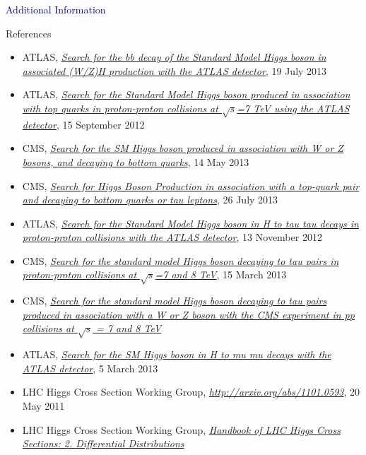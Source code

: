 \documentclass{beamer}
\begin{document}
\begin{frame}
	\textcolor{Navy}{Additional Information}
\end{frame}


\begin{frame}{References}
	\begin{itemize} \scriptsize
		\item ATLAS, \href{https://atlas.web.cern.ch/Atlas/GROUPS/PHYSICS/CONFNOTES/ATLAS-CONF-2013-079/}{ \textit{Search for the bb decay of the Standard Model Higgs boson in associated (W/Z)H production with the ATLAS detector}}, 19 July 2013
		\item ATLAS, \href{https://atlas.web.cern.ch/Atlas/GROUPS/PHYSICS/CONFNOTES/ATLAS-CONF-2012-135/}{\textit{Search for the Standard Model Higgs boson produced in association with top quarks in proton-proton collisions at $\sqrt s$=7 TeV using the ATLAS detector}}, 15 September 2012
		\item CMS, \href{http://cds.cern.ch/record/1546801?ln=en}{\textit{Search for the SM Higgs boson produced in association with W or Z bosons, and decaying to bottom quarks}}, 14 May 2013
		\item CMS, \href{http://cds.cern.ch/record/1564682?ln=en}{\textit{Search for Higgs Boson Production in association with a top-quark pair and decaying to bottom quarks or tau leptons}}, 26 July 2013
		\item ATLAS, \href{https://atlas.web.cern.ch/Atlas/GROUPS/PHYSICS/CONFNOTES/ATLAS-CONF-2012-160/}{\textit{Search for the Standard Model Higgs boson in H to tau tau decays in proton-proton collisions with the ATLAS detector}}, 13 November 2012
		\item CMS, \href{https://cds.cern.ch/record/1528271?ln=en}{\textit{Search for the standard model Higgs boson decaying to tau pairs in proton-proton collisions at $\sqrt s$=7 and 8 TeV}}, 15 March 2013
		\item CMS, \href{https://cds.cern.ch/record/1528147/files/HIG-12-053-pas.pdf}{\textit{Search for the standard model Higgs boson decaying to tau pairs produced in association with a W or Z boson with the CMS experiment in pp collisions at $\sqrt s$ = 7 and 8 TeV}}
		\item ATLAS, \href{https://atlas.web.cern.ch/Atlas/GROUPS/PHYSICS/CONFNOTES/ATLAS-CONF-2013-010/}{\textit{Search for the SM Higgs boson in H to mu mu decays with the ATLAS detector}}, 5 March 2013
		\item LHC Higgs Cross Section Working Group, \href{Handbook of LHC Higgs Cross Sections: 1. Inclusive Observables}{\textit{http://arxiv.org/abs/1101.0593}}, 20 May 2011
		\item LHC Higgs Cross Section Working Group, \href{http://arxiv.org/abs/1201.3084}{\textit{Handbook of LHC Higgs Cross Sections: 2. Differential Distributions}}
	\end{itemize}
\end{frame}
\end{document}
